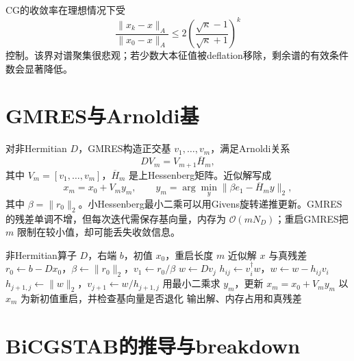 \documentclass[UTF8,12pt,a4paper,twoside,openany]{ctexbook}
\begin{document}
CG的收敛率在理想情况下受
\begin{equation}
  \frac{\|x_k-x\|_A}{\|x_0-x\|_A}
  \le2\left(
  \frac{\sqrt\kappa-1}{\sqrt\kappa+1}
  \right)^k
  \label{eq:cg-rate}
\end{equation}
控制。该界对谱聚集很悲观；若少数大本征值被deflation移除，剩余谱的有效条件数会显著降低。

\section{GMRES与Arnoldi基}

对非Hermitian \(D\)，GMRES构造正交基 \(v_1,\ldots,v_m\)，满足Arnoldi关系
\begin{equation}
  DV_m=V_{m+1}\overline H_m,
  \label{eq:arnoldi}
\end{equation}
其中 \(V_m=[v_1,\ldots,v_m]\)，\(\overline H_m\) 是上Hessenberg矩阵。近似解写成
\begin{equation}
  x_m=x_0+V_my_m,
  \qquad
  y_m=\arg\min_y\|\beta e_1-\overline H_my\|_2,
  \label{eq:gmres-small}
\end{equation}
其中 \(\beta=\|r_0\|_2\)。小Hessenberg最小二乘可以用Givens旋转递推更新。GMRES的残差单调不增，但每次迭代需保存基向量，内存为 \(\mathcal O(mN_D)\)；重启GMRES把 \(m\) 限制在较小值，却可能丢失收敛信息。

\begin{algorithm}[htbp]
\caption{重启GMRES的概念流程。}
\label{alg:gmres}
\begin{algorithmic}[1]
\Require 非Hermitian算子 \(D\)，右端 \(b\)，初值 \(x_0\)，重启长度 \(m\)
\Ensure 近似解 \(x\) 与真残差
\State \(r_0\gets b-Dx_0\)，\(\beta\gets\|r_0\|_2\)，\(v_1\gets r_0/\beta\)
  \State \(w\gets Dv_j\)
    \State \(h_{ij}\gets v_i^\dagger w\)，\(w\gets w-h_{ij}v_i\)
  \EndFor
  \State \(h_{j+1,j}\gets\|w\|_2\)，\(v_{j+1}\gets w/h_{j+1,j}\)
\EndFor
\State 用最小二乘求 \(y_m\)，更新 \(x_m=x_0+V_my_m\)
  \State 以 \(x_m\) 为新初值重启，并检查基向量是否退化
\EndIf
\State 输出解、内存占用和真残差
\end{algorithmic}
\end{algorithm}

\section{BiCGSTAB的推导与breakdown}
\end{document}
